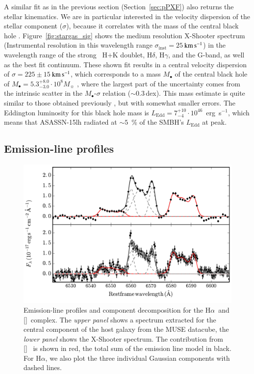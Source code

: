 \documentclass[traditabstract]{aa}
\newcommand{\kms}{$\rm{km\,s^{-1}}$}
\newcommand{\ha}{H$\alpha$}
\newcommand{\hg}{H$\gamma$}
\newcommand{\hd}{H$\delta$}
\newcommand{\nii}{[\ion{N}{ii}]}
\begin{document}
A similar fit as in the previous section (Section~\ref{sec:pPXF}) also returns the stellar kinematics. We are in particular interested in the velocity dispersion of the stellar component ($\sigma$), because it correlates with the mass of the central black hole \citep{2000ApJ...539L...9F, 2000ApJ...539L..13G}. Figure~\ref{fig:stargas_sig} shows the medium resolution X-Shooter spectrum (Instrumental resolution in this wavelength range $\sigma_{\mathrm{inst}}=25$\,\kms) in the wavelength range of the strong ~H+K doublet, \hd, \hg, and the G-band, as well as the best fit continuum. These shown fit results in a central velocity dispersion of $\sigma=225\pm15$\,\kms, which corresponds to a mass $M_\bullet$ of the central black hole of $M_\bullet = 5.3_{-3.0}^{+8.0}\cdot10^{8} M_\sun$ \citep[Eq. 3, 5 or 7 in][]{2013ARA&A..51..511K}, where the largest part of the uncertainty comes from the intrinsic scatter in the $M_\bullet$-$\sigma$ relation ($\sim0.3$\,dex). This mass estimate is quite similar to those obtained previously  \citep{2015ATel.7776....1P, 2016NatAs...1E...2L}, but with somewhat smaller errors. The Eddington luminosity for this black hole mass is $L_{\mathrm{Edd}}=7_{-4}^{+10}\cdot10^{46}$~erg~s$^{-1}$, which means that ASASSN-15lh radiated at $\sim 5$~\% of the SMBH's $L_{\mathrm{Edd}}$ at peak.


\subsection{Emission-line profiles}
\label{sec:prof}

\begin{figure}
  \includegraphics[width=0.999\linewidth]{fig/MUSE_XS_lineshape.pdf}
\caption{Emission-line profiles and component decomposition for the \ha\, and \nii\, complex. The \textit{upper panel} shows a spectrum extracted for the central component of the host galaxy from the MUSE datacube, the \textit{lower panel} shows the X-Shooter spectrum. The contribution from \nii~ is shown in red, the total sum of the emission line model in black. For \ha, we also plot the three individual Gaussian components with dashed lines.}
\label{fig:hanii}
\end{figure}
\end{document}
